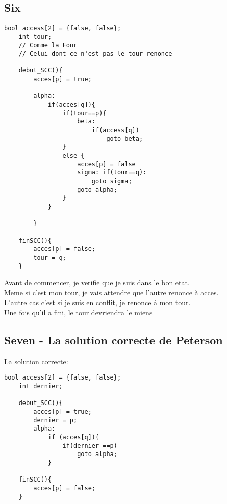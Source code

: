 \documentclass[11pt]{article}
\begin{document}
\pagebreak

\subsection{Six}

\begin{lstlisting}[frame=single]
	bool access[2] = {false, false};
	int tour;
	// Comme la Four
	// Celui dont ce n'est pas le tour renonce

	debut_SCC(){
		acces[p] = true;
		
		alpha:
			if(acces[q]){
				if(tour==p){
					beta:
						if(access[q])
							goto beta;
				}
				else {
					acces[p] = false
					sigma: if(tour==q):
						goto sigma;
					goto alpha;
				}
			}

		}

	finSCC(){
		acces[p] = false;
		tour = q;
	}
\end{lstlisting}
Avant de commencer, je verifie que je suis dans le bon etat.\\
Meme si c'est mon tour, je vais attendre que l'autre renonce à acces.\\
L'autre cas c'est si je suis en conflit, je renonce à mon tour.\\
Une fois qu'il a fini, le tour devriendra le miens

\pagebreak

\subsection{Seven - La solution correcte de Peterson}
La solution correcte:
\begin{lstlisting}[frame=single]
	bool access[2] = {false, false};
	int dernier;

	debut_SCC(){
		acces[p] = true;
		dernier = p;
		alpha:
			if (acces[q]){
				if(dernier ==p)
					goto alpha;
			}

	finSCC(){
		acces[p] = false;
	}

\end{lstlisting}
\end{document}
